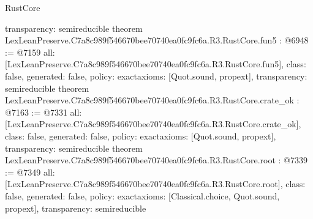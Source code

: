 \begin{lexlean}{RustCore}
\begin{coremodule}
{  transparency: semireducible
}
theorem LexLeanPreserve.C7a8c989f546670bee70740ea0fc9fc6a.R3.RustCore.fun5 : @6948 := @7159 {
  all: [LexLeanPreserve.C7a8c989f546670bee70740ea0fc9fc6a.R3.RustCore.fun5],
  class: false,
  generated: false,
  policy: exact{axioms: [Quot.sound, propext]},
  transparency: semireducible
}
theorem LexLeanPreserve.C7a8c989f546670bee70740ea0fc9fc6a.R3.RustCore.crate_ok : @7163 := @7331 {
  all: [LexLeanPreserve.C7a8c989f546670bee70740ea0fc9fc6a.R3.RustCore.crate_ok],
  class: false,
  generated: false,
  policy: exact{axioms: [Quot.sound, propext]},
  transparency: semireducible
}
theorem LexLeanPreserve.C7a8c989f546670bee70740ea0fc9fc6a.R3.RustCore.root : @7339 := @7349 {
  all: [LexLeanPreserve.C7a8c989f546670bee70740ea0fc9fc6a.R3.RustCore.root],
  class: false,
  generated: false,
  policy: exact{axioms: [Classical.choice, Quot.sound, propext]},
  transparency: semireducible
}


\end{coremodule}
\end{lexlean}
